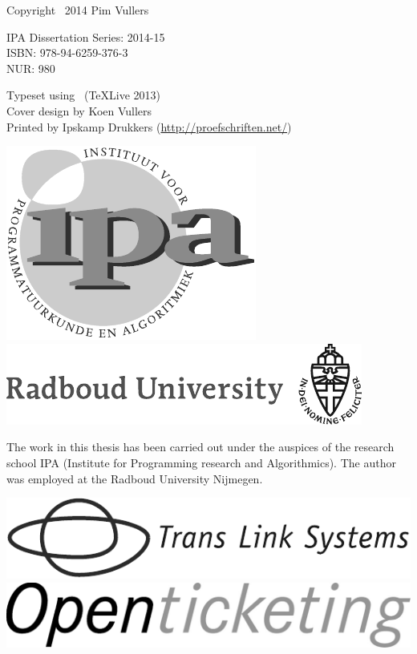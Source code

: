 \thispagestyle{empty}

\noindent
Copyright \textcopyright\ 2014 Pim Vullers \\\null

\noindent
IPA Dissertation Series: 2014-15 \\
ISBN: 978-94-6259-376-3 \\
NUR: 980 \\\null

\noindent 
Typeset using \LaTeXe\ (\TeX Live 2013) \\
Cover design by Koen Vullers \\
Printed by Ipskamp Drukkers (\url{http://proefschriften.net/}) \\\null

\vspace{35mm}

\begin{center}
\includegraphics[scale=.7,valign=M,raise=.5ex]{images/ipalogo}
\qquad
\includegraphics[valign=M,raise=.5ex]{images/radboudlogo}
\end{center}

\noindent
The work in this thesis has been carried out under the auspices of the research school IPA (Institute for Programming research and Algorithmics).
The author was employed at the Radboud University Nijmegen.

\vspace{20mm}

\begin{center}
\includegraphics[width=.45\textwidth,valign=M,raise=.5ex]{images/tlslogo}
\qquad
\includegraphics[width=.45\textwidth,valign=M,raise=.5ex]{images/openticketinglogo}
\end{center}

